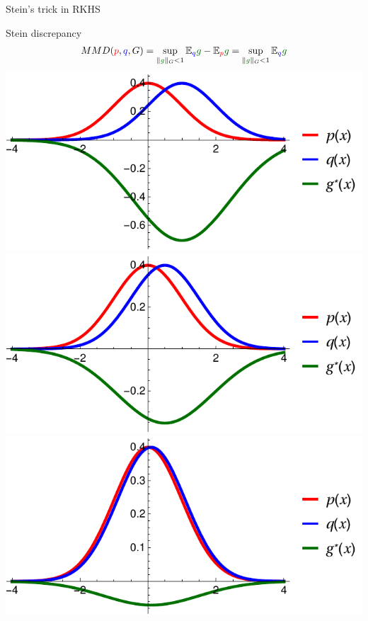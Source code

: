 \begin{frame}
\begin{columns}
\begin{column}{.33\linewidth}
\begin{block}{Stein's trick in RKHS}
\end{block}
\vspace{-0.75cm}

\begin{block}{Stein discrepancy}
\large
\begin{align*}
MMD({\color{red} p},{ \color{blue} q},G) = \sup_{   \| {\color{mg} g} \|_G<1} \ev_{{ \color{blue} q}}{\color{mg}g} - \ev_{{\color{red} p}} {\color{mg}g}  = \sup_{ \| {\color{mg} g} \|_G<1} \ev_{{ \color{blue} q}} {\color{mg}g} 
\end{align*}
\vspace{2cm}
\centering
\includegraphics[scale=1.2]{../../presentation/img/s1.pdf}
\includegraphics[scale=1.2]{../../presentation/img/s05.pdf}\\
\includegraphics[scale=1.2]{../../presentation/img/s01.pdf}

\end{block}
\end{column}
\end{columns}
\end{frame}
